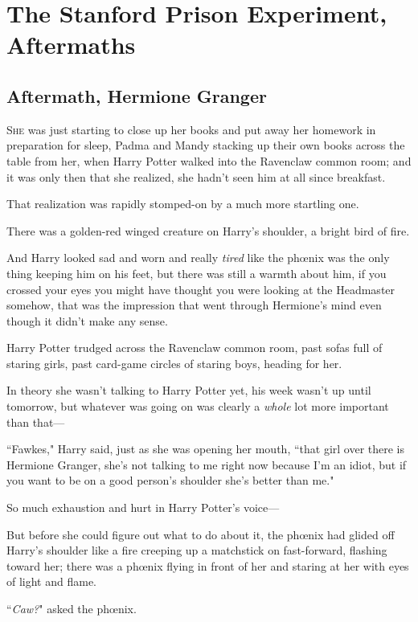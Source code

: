 \chapter{The Stanford Prison Experiment, Aftermaths}

\section{Aftermath, Hermione Granger}

\lettrine{S}{he} was just starting to close up her books and put away her homework in preparation for sleep, Padma and Mandy stacking up their own books across the table from her, when Harry Potter walked into the Ravenclaw common room; and it was only then that she realized, she hadn't seen him at all since breakfast.

That realization was rapidly stomped-on by a much more startling one.

There was a golden-red winged creature on Harry's shoulder, a bright bird of fire.

And Harry looked sad and worn and really \emph{tired} like the phœnix was the only thing keeping him on his feet, but there was still a warmth about him, if you crossed your eyes you might have thought you were looking at the Headmaster somehow, that was the impression that went through Hermione's mind even though it didn't make any sense.

Harry Potter trudged across the Ravenclaw common room, past sofas full of staring girls, past card-game circles of staring boys, heading for her.

In theory she wasn't talking to Harry Potter yet, his week wasn't up until tomorrow, but whatever was going on was clearly a \emph{whole} lot more important than that---

``Fawkes," Harry said, just as she was opening her mouth, ``that girl over there is Hermione Granger, she's not talking to me right now because I'm an idiot, but if you want to be on a good person's shoulder she's better than me."

So much exhaustion and hurt in Harry Potter's voice---

But before she could figure out what to do about it, the phœnix had glided off Harry's shoulder like a fire creeping up a matchstick on fast-forward, flashing toward her; there was a phœnix flying in front of her and staring at her with eyes of light and flame.

``\emph{Caw?}" asked the phœnix.

